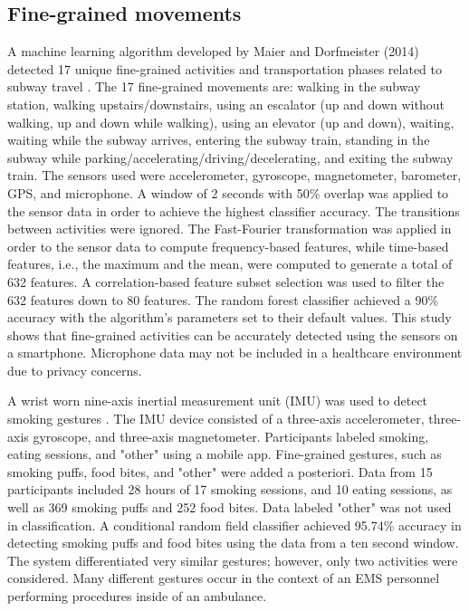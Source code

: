 \subsection{Fine-grained movements}
A machine learning algorithm developed by Maier and Dorfmeister (2014) detected 17 unique fine-grained activities and transportation phases related to subway travel \cite{Dorfmeister2014}. The 17 fine-grained movements are: walking in the subway station, walking upstairs/downstairs, using an escalator (up and down without walking, up and down while walking), using an elevator (up and down), waiting, waiting while the subway arrives, entering the subway train, standing in the subway while parking/accelerating/driving/decelerating, and exiting the subway train. The sensors used were accelerometer, gyroscope, magnetometer, barometer, GPS, and microphone. A window of 2 seconds with 50\% overlap was applied to the sensor data in order to achieve the highest classifier accuracy. The transitions between activities were ignored. The Fast-Fourier transformation was applied in order to the sensor data to compute frequency-based features, while time-based features, i.e., the maximum and the mean, were computed to generate a total of 632 features. A correlation-based feature subset selection was used to filter the 632 features down to 80 features. The random forest classifier achieved a 90\% accuracy with the algorithm's parameters set to their default values. This study shows that fine-grained activities can be accurately detected using the sensors on a smartphone. Microphone data may not be included in a healthcare environment due to privacy concerns.
\par A wrist worn nine-axis inertial measurement unit (IMU) was used to detect smoking gestures \cite{Parate2014}. The IMU device consisted of a three-axis accelerometer, three-axis gyroscope, and three-axis magnetometer. Participants labeled smoking, eating sessions, and "other" using a mobile app. Fine-grained gestures, such as smoking puffs, food bites, and "other" were added a posteriori. Data from 15 participants included 28 hours of 17 smoking sessions, and 10 eating sessions, as well as 369 smoking puffs and 252 food bites. Data labeled "other" was not used in classification. A conditional random field classifier achieved 95.74\% accuracy in detecting smoking puffs and food bites using the data from a ten second window. The system differentiated very similar gestures; however, only two activities were considered. Many different gestures occur in the context of an EMS personnel performing procedures inside of an ambulance.
